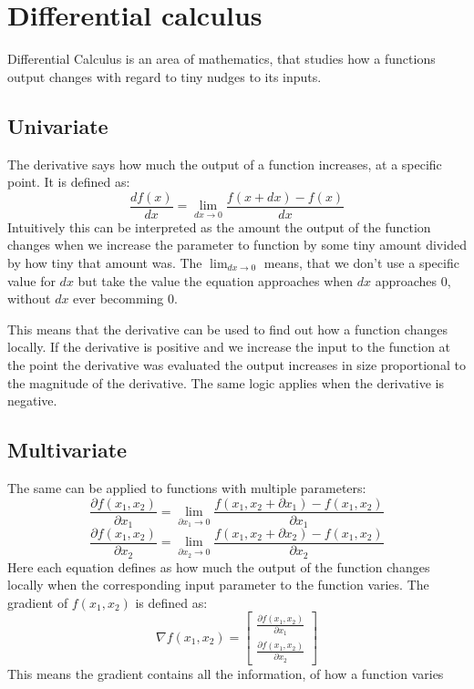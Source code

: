 \section{Differential calculus}
Differential Calculus is an area of mathematics, that studies how a functions output changes with regard to tiny nudges to its inputs.

\subsection{Univariate}
The derivative says how much the output of a function increases, at a specific point. It is defined as:
\begin{equation}
	\frac{df(x)}{dx} = \lim_{dx \to 0}\frac{f(x + dx) - f(x)}{dx}
\end{equation}
Intuitively this can be interpreted as the amount the output of the function changes when we increase the parameter to function by some tiny amount divided by how tiny that amount was. The $\lim_{dx \to 0}$ means, that we don't use a specific value for $dx$ but take the value the equation approaches when $dx$ approaches $0$, without $dx$ ever becomming $0$.

This means that the derivative can be used to find out how a function changes locally. If the derivative is positive and we increase the input to the function at the point the derivative was evaluated the output increases in size proportional to the magnitude of the derivative. The same logic applies when the derivative is negative.

\subsection{Multivariate}
The same can be applied to functions with multiple parameters:
\begin{equation}
	\frac{\partial f(x_1, x_2)}{\partial x_1} = \lim_{\partial x_1 \to 0}\frac{f(x_1, x_2 + \partial x_1) - f(x_1, x_2)}{\partial x_1}
\end{equation}
\begin{equation}
	\frac{\partial f(x_1, x_2)}{\partial x_2} = \lim_{\partial x_2 \to 0}\frac{f(x_1, x_2 + \partial x_2) - f(x_1, x_2)}{\partial x_2}
\end{equation}
Here each equation defines as how much the output of the function changes locally when the corresponding input parameter to the function varies.
The gradient of $f(x_1, x_2)$ is defined as:
\begin{equation}
\nabla f(x_1, x_2) =
	\begin{bmatrix}
	\frac{\partial f(x_1, x_2)}{\partial x_1} \\[2mm]
	\frac{\partial f(x_1, x_2)}{\partial x_2}
	\end{bmatrix}
\end{equation}
This means the gradient contains all the information, of how a function varies

